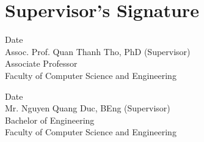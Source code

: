 \newpage

\section*{\Huge Supervisor's Signature}

\vspace{2cm}
\noindent\blank{10cm}Date\blank{5cm}\\
Assoc. Prof. Quan Thanh Tho, PhD (Supervisor)\\
Associate Professor\\
Faculty of Computer Science and Engineering

\vspace{5cm}
\noindent\blank{10cm}Date\blank{5cm}\\
Mr. Nguyen Quang Duc, BEng (Supervisor)\\
Bachelor of Engineering\\
Faculty of Computer Science and Engineering
